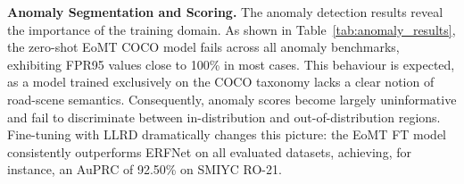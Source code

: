 \documentclass[10pt,twocolumn,letterpaper]{article}
\begin{document}
\begin{table}[t]
\centering
\caption{Temperature Scaling on MSP (AuPRC \%). For each model and benchmark we
report the baseline ($T{=}1$), the best value found via grid search over
$T \in [0.1, 2.0]$, the optimal temperature $T^\star$, and the resulting gain
$\Delta$.}
\label{tab:tempscaling}
\scriptsize
\setlength{\tabcolsep}{2.5pt}
\end{table}

\textbf{Anomaly Segmentation and Scoring.}
The anomaly detection results reveal the importance of the training domain. As shown in Table~\ref{tab:anomaly_results}, the zero-shot EoMT COCO model fails across all anomaly benchmarks, exhibiting FPR95 values close to 100\% in most cases. This behaviour is expected, as a model trained exclusively on the COCO taxonomy lacks a clear notion of road-scene semantics. Consequently, anomaly scores become largely uninformative and fail to discriminate between in-distribution and out-of-distribution regions. Fine-tuning with LLRD dramatically changes this picture: the EoMT FT model consistently outperforms ERFNet on all evaluated datasets, achieving, for instance, an AuPRC of 92.50\% on SMIYC RO-21.
\end{document}
